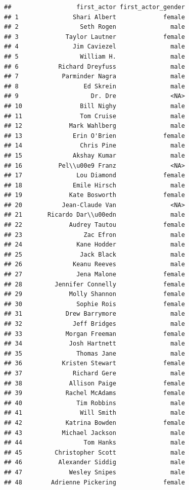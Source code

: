 \documentclass[
]{article}
\begin{document}
\begin{verbatim}
##                  first_actor first_actor_gender
## 1               Shari Albert             female
## 2                 Seth Rogen               male
## 3             Taylor Lautner             female
## 4               Jim Caviezel               male
## 5                 William H.               male
## 6           Richard Dreyfuss               male
## 7            Parminder Nagra               male
## 8                  Ed Skrein               male
## 9                    Dr. Dre               <NA>
## 10                Bill Nighy               male
## 11                Tom Cruise               male
## 12             Mark Wahlberg               male
## 13              Erin O'Brien             female
## 14                Chris Pine               male
## 15              Akshay Kumar               male
## 16          Pel\\u00e9 Franz               <NA>
## 17               Lou Diamond             female
## 18              Emile Hirsch               male
## 19             Kate Bosworth             female
## 20           Jean-Claude Van               <NA>
## 21       Ricardo Dar\\u00edn               male
## 22             Audrey Tautou             female
## 23                 Zac Efron               male
## 24               Kane Hodder               male
## 25                Jack Black               male
## 26              Keanu Reeves               male
## 27               Jena Malone             female
## 28         Jennifer Connelly             female
## 29             Molly Shannon             female
## 30               Sophie Rois             female
## 31            Drew Barrymore               male
## 32              Jeff Bridges               male
## 33            Morgan Freeman             female
## 34             Josh Hartnett               male
## 35               Thomas Jane               male
## 36           Kristen Stewart             female
## 37              Richard Gere               male
## 38             Allison Paige             female
## 39            Rachel McAdams             female
## 40               Tim Robbins               male
## 41                Will Smith               male
## 42            Katrina Bowden             female
## 43           Michael Jackson               male
## 44                 Tom Hanks               male
## 45         Christopher Scott               male
## 46          Alexander Siddig               male
## 47             Wesley Snipes               male
## 48        Adrienne Pickering             female

\end{verbatim}
\end{document}
